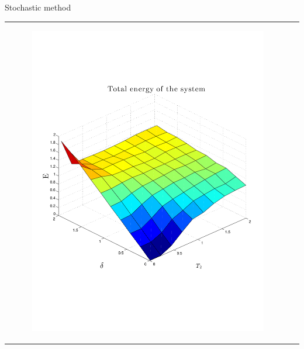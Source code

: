 \begin{frame}{Stochastic method}
\begin{tabular}{l l}
\begin{minipage}{0.6\textwidth}
\begin{block}{}
\begin{figure}
      	  						\includegraphics[width=\textwidth]{../src/plot/discreteSystems/TotalEnergyFunctionOfT2Stochastic.pdf}
      	  					\end{figure}
      	  		  	\end{block}
      	  	\end{minipage}
      	  	\end{tabular}	
      	
\end{frame}

